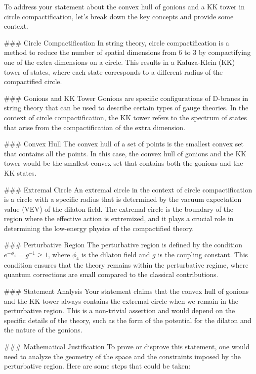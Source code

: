 To address your statement about the convex hull of gonions and a KK tower in circle compactification, let's break down the key concepts and provide some context.

### Circle Compactification
In string theory, circle compactification is a method to reduce the number of spatial dimensions from 6 to 3 by compactifying one of the extra dimensions on a circle. This results in a Kaluza-Klein (KK) tower of states, where each state corresponds to a different radius of the compactified circle.

### Gonions and KK Tower
Gonions are specific configurations of D-branes in string theory that can be used to describe certain types of gauge theories. In the context of circle compactification, the KK tower refers to the spectrum of states that arise from the compactification of the extra dimension.

### Convex Hull
The convex hull of a set of points is the smallest convex set that contains all the points. In this case, the convex hull of gonions and the KK tower would be the smallest convex set that contains both the gonions and the KK states.

### Extremal Circle
An extremal circle in the context of circle compactification is a circle with a specific radius that is determined by the vacuum expectation value (VEV) of the dilaton field. The extremal circle is the boundary of the region where the effective action is extremized, and it plays a crucial role in determining the low-energy physics of the compactified theory.

### Perturbative Region
The perturbative region is defined by the condition \( e^{-\phi_4} = g^{-1} \geq 1 \), where \( \phi_4 \) is the dilaton field and \( g \) is the coupling constant. This condition ensures that the theory remains within the perturbative regime, where quantum corrections are small compared to the classical contributions.

### Statement Analysis
Your statement claims that the convex hull of gonions and the KK tower always contains the extremal circle when we remain in the perturbative region. This is a non-trivial assertion and would depend on the specific details of the theory, such as the form of the potential for the dilaton and the nature of the gonions.

### Mathematical Justification
To prove or disprove this statement, one would need to analyze the geometry of the space and the constraints imposed by the perturbative region. Here are some steps that could be taken:

